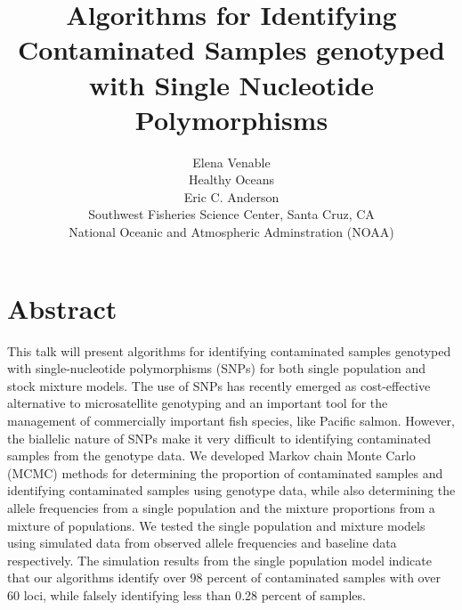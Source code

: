 \documentclass[12pt]{article}
\begin{document}
\normalem

\setlength{\parindent}{0cm}
\title{\textbf{Algorithms for Identifying Contaminated Samples genotyped with Single Nucleotide Polymorphisms}}
\author{\Large Elena Venable\\ 
	Healthy Oceans\\
	Eric C. Anderson\\
	Southwest Fisheries Science Center, Santa Cruz, CA\\
	National Oceanic and Atmospheric Adminstration (NOAA)}
\maketitle

\section*{Abstract} 
This talk will present algorithms for identifying contaminated samples genotyped with single-nucleotide polymorphisms (SNPs) for both single population and stock mixture models. The use of SNPs has recently emerged as cost-effective alternative to microsatellite genotyping and an important tool for the management of commercially important fish species, like Pacific salmon.  However, the biallelic nature of SNPs make it very difficult to identifying contaminated samples from the genotype data.  We developed Markov chain Monte Carlo (MCMC) methods for determining the proportion of contaminated samples and identifying contaminated samples using genotype data, while also determining the allele frequencies from a single population and the mixture proportions from a mixture of populations.  We tested the single population and mixture models using simulated data from observed allele frequencies and baseline data respectively.  The simulation results from the single population model indicate that our algorithms identify over 98 percent of contaminated samples with over 60 loci, while falsely identifying less than 0.28 percent of samples. 
\end{document}
